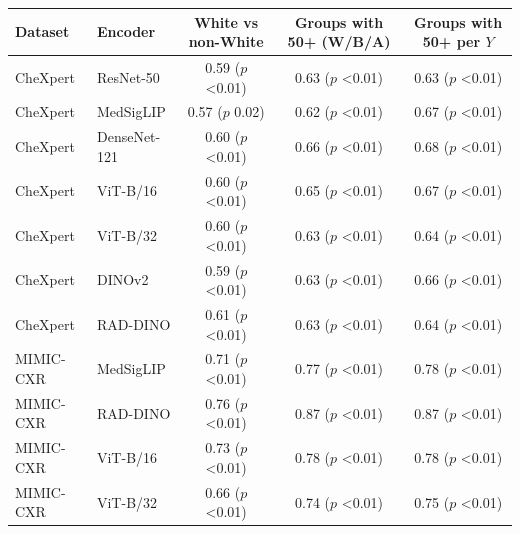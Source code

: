 \begin{tabular}{llccc}
\toprule
Dataset & Encoder & White vs non-White & Groups with 50+ (W/B/A) & Groups with 50+ per $Y$ \\
\midrule
CheXpert & ResNet-50 & 0.59 ($p$ <0.01) & 0.63 ($p$ <0.01) & 0.63 ($p$ <0.01) \\
CheXpert & MedSigLIP & 0.57 ($p$ 0.02) & 0.62 ($p$ <0.01) & 0.67 ($p$ <0.01) \\
CheXpert & DenseNet-121 & 0.60 ($p$ <0.01) & 0.66 ($p$ <0.01) & 0.68 ($p$ <0.01) \\
CheXpert & ViT-B/16 & 0.60 ($p$ <0.01) & 0.65 ($p$ <0.01) & 0.67 ($p$ <0.01) \\
CheXpert & ViT-B/32 & 0.60 ($p$ <0.01) & 0.63 ($p$ <0.01) & 0.64 ($p$ <0.01) \\
CheXpert & DINOv2 & 0.59 ($p$ <0.01) & 0.63 ($p$ <0.01) & 0.66 ($p$ <0.01) \\
CheXpert & RAD-DINO & 0.61 ($p$ <0.01) & 0.63 ($p$ <0.01) & 0.64 ($p$ <0.01) \\
\midrule
MIMIC-CXR & MedSigLIP & 0.71 ($p$ <0.01) & 0.77 ($p$ <0.01) & 0.78 ($p$ <0.01) \\
MIMIC-CXR & RAD-DINO & 0.76 ($p$ <0.01) & 0.87 ($p$ <0.01) & 0.87 ($p$ <0.01) \\
MIMIC-CXR & ViT-B/16 & 0.73 ($p$ <0.01) & 0.78 ($p$ <0.01) & 0.78 ($p$ <0.01) \\
MIMIC-CXR & ViT-B/32 & 0.66 ($p$ <0.01) & 0.74 ($p$ <0.01) & 0.75 ($p$ <0.01) \\
\bottomrule
\end{tabular}
